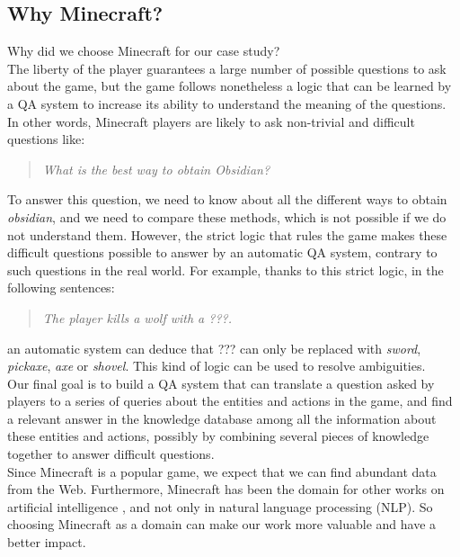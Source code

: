 \documentclass[12pt]{article}
\begin{document}
\subsection{Why Minecraft?}
Why did we choose Minecraft for our case study?\\
The liberty of the player guarantees a large number of possible questions to ask about the game, but the game follows nonetheless a logic that can be learned by a QA system to increase its ability to understand the meaning of the questions.\\
In other words, Minecraft players are likely to ask non-trivial and difficult questions like:
\begin{quote}
\textit{What is the best way to obtain Obsidian?}
\end{quote}
To answer this question, we need to know about all the different ways to obtain \textit{obsidian}, and we need to compare these methods, which is not possible if we do not understand them. However, the strict logic that rules the game makes these difficult questions possible to answer by an automatic QA system, contrary to such questions in the real world. For example, thanks to this strict logic, in the following sentences:
\begin{quote}
\textit{The player kills a wolf with a ???.}
\end{quote}
an automatic system can deduce that ??? can only be replaced with \textit{sword}, \textit{pickaxe}, \textit{axe} or \textit{shovel}. This kind of logic can be used to resolve ambiguities.\\
Our final goal is to build a QA system that can translate a question asked by players to a series of queries about the entities and actions in the game, and find a relevant answer in the knowledge database among all the information about these entities and actions, possibly by combining several pieces of knowledge together to answer difficult questions.\\
Since Minecraft is a popular game, we expect that we can find abundant data from the Web. Furthermore, Minecraft has been the domain for other works on artificial intelligence \cite{branavan2012learning,johnson2016malmo}, and not only in natural language processing (NLP). So choosing Minecraft as a domain can make our work more valuable and have a better impact.\\
\end{document}
